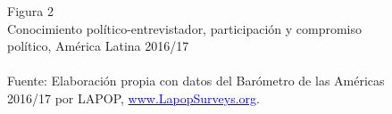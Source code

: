 \documentclass[a4paper]{tufte-handout}
\begin{document}
\begin{figure}[h!]
\captionsetup[subfigure]{labelformat=empty}
  \centering
  \smallskip\noindent\small Figura 2 \\ Conocimiento político-entrevistador, participación y compromiso político, América Latina 2016/17
  \\
  \\ \smallskip\noindent\scriptsize Fuente: Elaboración propia con datos del Barómetro de las Américas 2016/17 por LAPOP, \href{https://www.vanderbilt.edu/lapop/}{\textcolor{blue}{www.LapopSurveys.org}}.
\end{figure}
\end{document}
